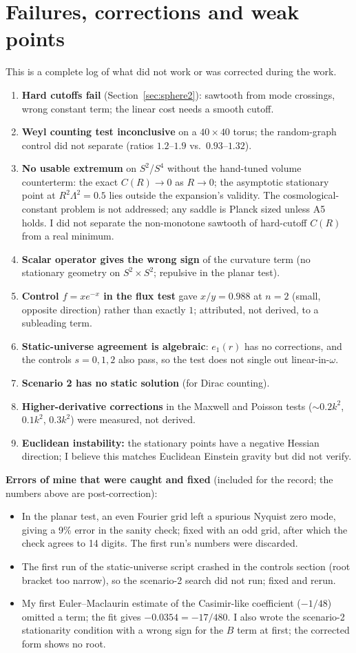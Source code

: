 \documentclass[11pt]{article}
\begin{document}
\section{Failures, corrections and weak points}
\label{sec:failures}
This is a complete log of what did not work or was corrected during the work.
\begin{enumerate}
\item \textbf{Hard cutoffs fail} (Section~\ref{sec:sphere2}): sawtooth from mode crossings, wrong constant term; the linear cost needs a smooth cutoff.
\item \textbf{Weyl counting test inconclusive} on a $40\times40$ torus; the random-graph control did not separate (ratios $1.2$--$1.9$ vs.\ $0.93$--$1.32$).
\item \textbf{No usable extremum} on $S^2$/$S^4$ without the hand-tuned volume counterterm: the exact $C(R)\to0$ as $R\to0$; the asymptotic stationary
point at $R^2\Lambda^2=0.5$ lies outside the expansion's validity. The cosmological-constant problem is not addressed; any saddle is Planck sized unless A5 holds.
I did not separate the non-monotone sawtooth of hard-cutoff $C(R)$ from a real minimum.
\item \textbf{Scalar operator gives the wrong sign} of the curvature term (no stationary geometry on $S^2\times S^2$; repulsive in the planar test).
\item \textbf{Control $f=xe^{-x}$ in the flux test} gave $x/y=0.988$ at $n=2$ (small, opposite direction) rather than exactly $1$; attributed, not derived, to a subleading term.
\item \textbf{Static-universe agreement is algebraic}: $e_1(r)$ has no corrections, and the controls $s=0,1,2$ also pass, so the test does not single out linear-in-$\omega$.
\item \textbf{Scenario 2 has no static solution} (for Dirac counting).
\item \textbf{Higher-derivative corrections} in the Maxwell and Poisson tests ($\sim0.2k^2$, $0.1k^2$, $0.3k^2$) were measured, not derived.
\item \textbf{Euclidean instability:} the stationary points have a negative Hessian direction; I believe this matches Euclidean Einstein gravity but did not verify.
\end{enumerate}
\textbf{Errors of mine that were caught and fixed} (included for the record; the numbers above are post-correction):
\begin{itemize}
\item In the planar test, an even Fourier grid left a spurious Nyquist zero mode, giving a 9\% error in the sanity check; fixed with an odd grid, after which the check agrees to 14 digits. The first run's numbers were discarded.
\item The first run of the static-universe script crashed in the controls section (root bracket too narrow), so the scenario-2 search did not run; fixed and rerun.
\item My first Euler--Maclaurin estimate of the Casimir-like coefficient ($-1/48$) omitted a term; the fit gives $-0.0354=-17/480$. I also wrote the scenario-2 stationarity condition with a wrong sign for the $B$ term at first; the corrected form shows no root.
\end{itemize}
\end{document}
